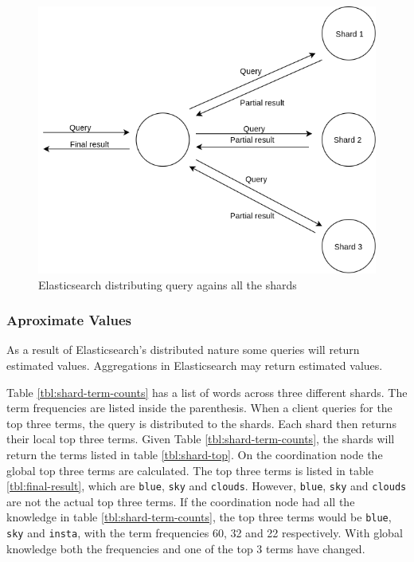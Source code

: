 \begin{figure}[h]
  \centering
  \includegraphics[width=0.9\linewidth]{img/elasticsearch-sharding.png}
  \caption{Elasticsearch distributing query agains all the shards}
  \label{fig:elasticsearch-sharding}
\end{figure}

\subsubsection{Aproximate Values}
As a result of Elasticsearch's distributed nature some queries will return estimated values.
Aggregations in Elasticsearch may return estimated values.

Table \ref{tbl:shard-term-counts} has a list of words across three different shards.
The term frequencies are listed inside the parenthesis.
When a client queries for the top three terms, the query is distributed to the shards.
Each shard then returns their local top three terms.
Given Table \ref{tbl:shard-term-counts},
the shards will return the terms listed in table \ref{tbl:shard-top}.
On the coordination node the global top three terms are calculated.
The top three terms is listed in table \ref{tbl:final-result}, which are \texttt{blue}, \texttt{sky} and \texttt{clouds}.
However, \texttt{blue}, \texttt{sky} and \texttt{clouds} are not the actual top three terms.
If the coordination node had all the knowledge in table \ref{tbl:shard-term-counts},
the top three terms would be \texttt{blue}, \texttt{sky} and \texttt{insta},
with the term frequencies 60, 32 and 22 respectively.
With global knowledge both the frequencies and one of the top 3 terms have changed.

